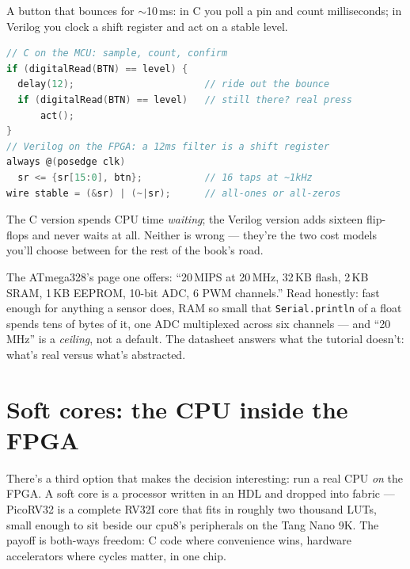 \begin{example}
A button that bounces for $\sim$10\,ms: in C you poll a pin and
count milliseconds; in Verilog you clock a shift register and act
on a stable level.

\begin{lstlisting}[caption={Debounce both ways (shown, not run):
the C that waits, the Verilog that filters.},language=C]
// C on the MCU: sample, count, confirm
if (digitalRead(BTN) == level) {
  delay(12);                       // ride out the bounce
  if (digitalRead(BTN) == level)   // still there? real press
      act();
}
// Verilog on the FPGA: a 12ms filter is a shift register
always @(posedge clk)
  sr <= {sr[15:0], btn};           // 16 taps at ~1kHz
wire stable = (&sr) | (~|sr);      // all-ones or all-zeros
\end{lstlisting}

The C version spends CPU time \emph{waiting}; the Verilog version
adds sixteen flip-flops and never waits at all. Neither is wrong
--- they're the two cost models you'll choose between for the rest
of the book's road.
\end{example}

\begin{example}
The ATmega328's page one offers: ``20\,MIPS at 20\,MHz, 32\,KB
flash, 2\,KB SRAM, 1\,KB EEPROM, 10-bit ADC, 6 PWM channels.''
Read honestly: fast enough for anything a sensor does, RAM so
small that \texttt{Serial.println} of a float spends tens of
bytes of it, one ADC multiplexed across six channels --- and
``20\,MHz'' is a \emph{ceiling}, not a default. The datasheet
answers what the tutorial doesn't: what's real versus what's
abstracted.
\end{example}

\section{Soft cores: the CPU inside the FPGA}\label{sec:softcore19}

There's a third option that makes the decision interesting: run a
real CPU \emph{on} the FPGA. A soft core is a processor written
in an HDL and dropped into fabric --- PicoRV32 is a complete
RV32I core that fits in roughly two thousand LUTs, small enough to
sit beside our cpu8's peripherals on the Tang Nano 9K. The payoff
is both-ways freedom: C code where convenience wins, hardware
accelerators where cycles matter, in one chip.

